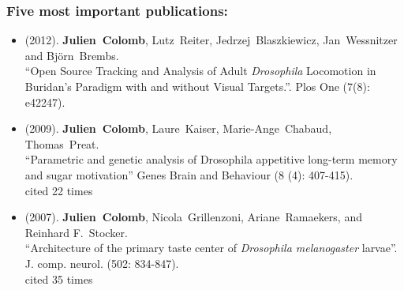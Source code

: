 \subsubsection{Five most important publications:}
\label{sec:FiveMostImportantPublications}

\begin{sloppypar}
\newcommand{\enquote}[1]{``#1''}
\providecommand{\bibinfo}[2]{#2}
%
%
%
%   
%   
%     
\begin{itemize}   
 
\item  (\bibinfo{year}{2012}).
  \bibinfo{author}{\textbf{Julien~Colomb}}, \bibinfo{author}{Lutz~Reiter},
  \bibinfo{author}{Jedrzej~Blaszkiewicz}, 
  \bibinfo{author}{Jan~Wessnitzer} and \bibinfo{author}{Bj\"{o}rn~Brembs}. \\
\newblock \enquote{\bibinfo{title}{Open Source Tracking and Analysis of Adult \textit{Drosophila} Locomotion in Buridan's Paradigm with and without Visual Targets.}}.
\newblock \bibinfo{journal}{Plos One}
  (\bibinfo{pages}{7(8): e42247}).

\item   (\bibinfo{year}{2009}).  
 \bibinfo{author}{\textbf{Julien~Colomb}}, \bibinfo{author}{Laure~Kaiser}, \bibinfo{author}{Marie-Ange~Chabaud}, \bibinfo{author}{Thomas~Preat}.
\\
\newblock \enquote{\bibinfo{title}{Parametric and genetic analysis of Drosophila appetitive long-term memory and sugar motivation}}
\newblock \bibinfo{journal}{Genes Brain and Behaviour}
  (\bibinfo{pages}{8 (4): 407-415}).
   \\cited 22 times%
   

   

 
 
  \item  (\bibinfo{year}{2007}).
\bibinfo{author}{\textbf{Julien~Colomb}}, \bibinfo{author}{Nicola~Grillenzoni}, \bibinfo{author}{Ariane~Ramaekers}, and
  \bibinfo{author}{Reinhard F.~Stocker}.\\
\newblock \enquote{\bibinfo{title}{Architecture of the primary taste center of \textit{Drosophila melanogaster} larvae}}.
\newblock \bibinfo{journal}{J. comp. neurol.}
  (\bibinfo{pages}{502: 834-847}).
   \\  cited 35 times%


\end{itemize}
\end{sloppypar}
